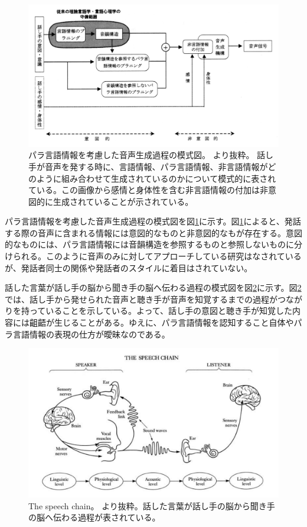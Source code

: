 \newpage

\begin{figure}[hbtp]
 \centering
   \includegraphics[width=12.0cm]{figures/maekawa_kitagawa.png}
 \caption[パラ言語情報を考慮した音声生成過程の模式図]{パラ言語情報を考慮した音声生成過程の模式図。 \cite{maekawa_kitagawa}より抜粋。 話し手が音声を発する時に、言語情報、パラ言語情報、非言語情報がどのように組み合わせて生成されているのかについて模式的に表されている。この画像から感情と身体性を含む非言語情報の付加は非意図的に生成されていることが示されている。 }
 \label{maekawa_kitgawa:fig}
\end{figure}


パラ言語情報を考慮した音声生成過程の模式図を図\ref{maekawa_kitgawa:fig}に示す。図\ref{maekawa_kitgawa:fig}によると、発話する際の音声に含まれる情報には意図的なものと非意図的なもが存在する。意図的なものには、パラ言語情報には音韻構造を参照するものと参照しないものに分けられる。このように音声のみに対してアプローチしている研究はなされているが、発話者同士の関係や発話者のスタイルに着目はされていない。

話した言葉が話し手の脳から聞き手の脳へ伝わる過程の模式図を図\ref{speech_chain:fig}に示す。図\ref{speech_chain:fig}では、話し手から発せられた音声と聴き手が音声を知覚するまでの過程がつながりを持っていることを示している。よって、話し手の意図と聴き手が知覚した内容には齟齬が生じることがある。ゆえに、パラ言語情報を認知すること自体やパラ言語情報の表現の仕方が曖昧なのである。

\begin{figure}[hbtp]
 \centering
   \includegraphics[width=12.0cm]{figures/speech_chain.png}
 \caption[The speech chain]{The speech chain。 \cite{speech_chain}より抜粋。話した言葉が話し手の脳から聞き手の脳へ伝わる過程が表されている。 }
 \label{speech_chain:fig}
\end{figure}





